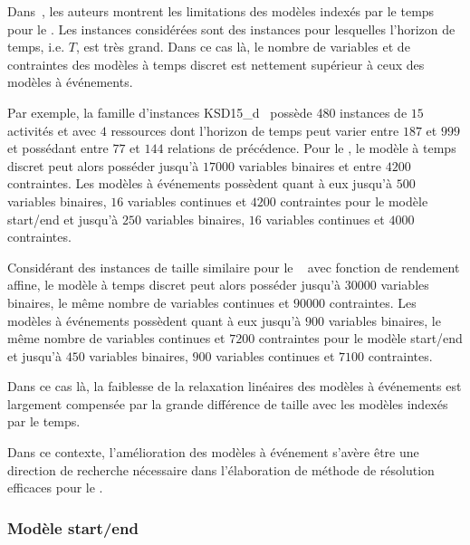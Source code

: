 Dans~\cite{modele_RCPSP}, les auteurs montrent les limitations des
modèles indexés par le temps pour le \RCPSP. Les instances considérées
sont des instances pour lesquelles l'horizon de temps, i.e. $T$, est
très grand. Dans ce cas là, le nombre de variables et de contraintes
des modèles à temps discret est nettement supérieur à ceux des modèles
à événements. 

Par exemple, la famille d'instances KSD15\_d~\cite{theseOumar} possède
480 instances de $15$ activités et avec $4$ ressources dont l'horizon
de temps peut varier entre $187$ et $999$ et possédant entre $77$ et
$144$ relations de précédence. Pour le \RCPSP, le modèle à temps
discret peut alors posséder jusqu'à $17000$ variables binaires et
entre $4200$ contraintes. Les modèles à événements possèdent quant à
eux jusqu'à $500$ variables binaires, $16$ variables continues et
$4200$ contraintes pour le modèle start/end et jusqu'à $250$ variables
binaires, $16$ variables continues et $4000$ contraintes.

Considérant des instances de taille similaire pour le \CECSP~ avec
fonction de rendement affine, le modèle à temps discret peut alors
posséder jusqu'à $30000$ variables binaires, le même nombre de
variables continues et $90000$ contraintes.  Les modèles à événements
possèdent quant à eux jusqu'à $900$ variables binaires, le même nombre
de variables continues et $7200$ contraintes pour le modèle start/end
et jusqu'à $450$ variables binaires, $900$ variables continues et
$7100$ contraintes.

Dans ce cas là, la faiblesse de la relaxation linéaires des modèles à
événements est largement compensée par la grande différence de taille
avec les modèles indexés par le temps. 

Dans ce contexte, l'amélioration des modèles à événement s'avère être
une direction de recherche nécessaire dans l'élaboration de méthode de
résolution efficaces pour le \RCPSP. 



\subsubsection{Modèle start/end}

